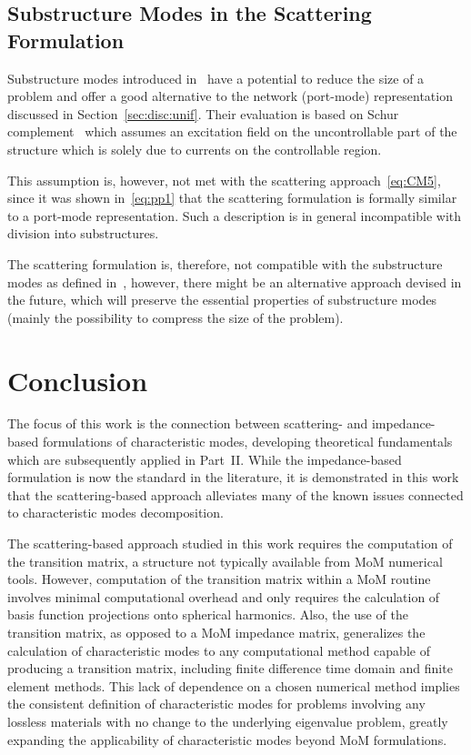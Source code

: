 \documentclass[journal]{IEEEtran}
\begin{document}
\subsection{Substructure Modes in the Scattering Formulation}
\label{sec:disc:sub}

Substructure modes introduced in~\cite{Ethier_2012_substructure_TCM} have a potential to reduce the size of a problem and offer a good alternative to the network (port-mode) representation discussed in Section~\ref{sec:disc:unif}. Their evaluation is based on Schur complement~\cite{HornJohnson_MatrixAnalysis} which assumes an excitation field on the uncontrollable part of the structure which is solely due to currents on the controllable region. 

This assumption is, however, not met with the scattering approach~\eqref{eq:CM5}, since it was shown in~\eqref{eq:pp1} that the scattering formulation is formally similar to a port-mode representation. Such a description is in general incompatible with division into substructures. 

The scattering formulation is, therefore, not compatible with the substructure modes as defined in~\cite{Ethier_2012_substructure_TCM}, however, there might be an alternative approach devised in the future, which will preserve the essential properties of substructure modes (mainly the possibility to compress the size of the problem).

\section{Conclusion}
\label{sec:concl}

The focus of this work is the connection between scattering- and impedance-based formulations of characteristic modes, developing theoretical fundamentals which are subsequently applied in Part~II. While the impedance-based formulation is now the standard in the literature, it is demonstrated in this work that the scattering-based approach alleviates many of the known issues connected to characteristic modes decomposition.

The scattering-based approach studied in this work requires the computation of the transition matrix, a structure not typically available from \ac{MoM} numerical tools. However, computation of the transition matrix within a \ac{MoM} routine involves minimal computational overhead and only requires the calculation of basis function projections onto spherical harmonics. Also, the use of the transition matrix, as opposed to a \ac{MoM} impedance matrix, generalizes the calculation of characteristic modes to any computational method capable of producing a transition matrix, including finite difference time domain and finite element methods.  This lack of dependence on a chosen numerical method implies the consistent definition of characteristic modes for problems involving any lossless materials with no change to the underlying eigenvalue problem, greatly expanding the applicability of characteristic modes beyond \ac{MoM} formulations.
\end{document}

